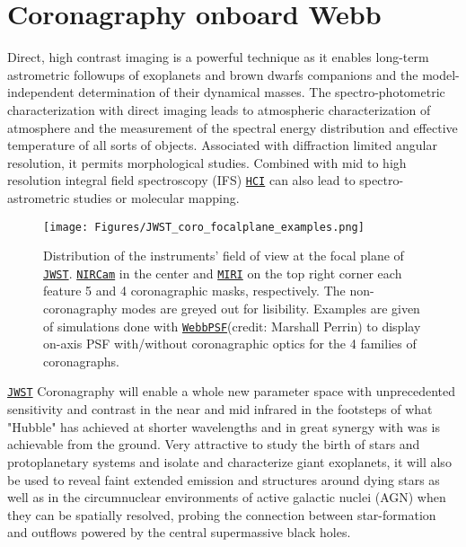 \documentclass[]{spie}  %
\newcommand{\jwst}{{\tt \href{https://jwst.stsci.edu}{JWST}}\xspace}
\newcommand{\nircam}{{\tt \href{https://jwst.stsci.edu/instrumentation/nircam}{NIRCam}}\xspace}
\newcommand{\miri}{{\tt \href{https://jwst.stsci.edu/instrumentation/miri}{MIRI}}\xspace}
\newcommand{\hci}{{\tt \href{https://jwst-docs.stsci.edu/display/JPP/JWST+High-Contrast+Imaging?q=High}{HCI}}\xspace}%
\newcommand{\webbpsf}{{\tt \href{https://webbpsf.readthedocs.io/en/stable/}{WebbPSF}}\xspace}%
\begin{document}
%

\section{Coronagraphy onboard Webb}
\label{sec:coro}  %

Direct, high contrast imaging is a powerful technique\cite{nakajima2005_di, chauvin2004, lagrange2010sci, bowler2016_review, chauvin2018_spie} as it enables long-term astrometric followups of exoplanets and brown dwarfs companions and the model-independent determination of their dynamical masses\cite{bowler2018}. The spectro-photometric characterization with direct imaging leads to atmospheric characterization of atmosphere and the measurement of the spectral energy distribution and effective temperature of all sorts of objects. Associated with diffraction limited angular resolution, it permits morphological studies. Combined with mid to high resolution integral field spectroscopy (IFS) \hci can also lead to spectro-astrometric studies\cite{whelan2008_spectroastrometry, blancocardenas2014_spectroastrometry_CRIRES} or molecular mapping\cite{nakajima2015_molecularmapping, hoeijmakers2018_molecularmapping}.

\begin{figure}[h!]
\begin{center}
\texttt{[image: Figures/JWST\_coro\_focalplane\_examples.png]}
\caption{Distribution of the instruments' field of view at the focal plane of \jwst. \nircam in the center and \miri on the top right corner each feature 5 and 4 coronagraphic masks, respectively. The non-coronagraphy modes are greyed out for lisibility. Examples are given of simulations done with \webbpsf (credit: Marshall Perrin) to display on-axis PSF with/without coronagraphic optics for the 4 families of coronagraphs.}
\label{fig:jwst-focal}
\end{center}
\end{figure}

\jwst Coronagraphy will enable a whole new parameter space with unprecedented sensitivity and contrast in the near and mid infrared in the footsteps of what "Hubble" has achieved at shorter wavelengths and in great synergy with was is achievable from the ground. Very attractive to study the birth of stars and protoplanetary systems and isolate and characterize giant exoplanets, it will also be used to reveal faint extended emission and structures around dying stars as well as in the circumnuclear environments of active galactic nuclei (AGN) when they can be spatially resolved, probing the connection between star-formation and outflows powered by the central supermassive black holes.
\end{document}
